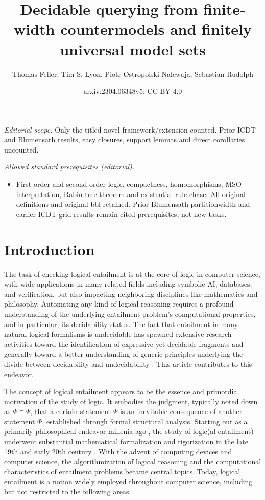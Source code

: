 \documentclass[10pt,a4paper]{amsart}
\title{Decidable querying from finite-width countermodels and finitely universal model sets}
\author{Thomas Feller, Tim S. Lyon, Piotr Ostropolski-Nalewaja, Sebastian Rudolph}
\date{arxiv:2304.06348v5; CC BY 4.0}
\theoremstyle{definition}
\numberwithin{equation}{section}
\theoremstyle{plain}
\theoremstyle{definition}
\theoremstyle{myexample}
\theoremstyle{plain}
\theoremstyle{definition}
\begin{document}
\maketitle
\noindent\textit{Editorial scope.} Only the titled novel framework/extension counted. Prior ICDT and Blumensath results, easy closures, support lemmas and direct corollaries uncounted.\par\medskip
\noindent\textit{Allowed standard prerequisites (editorial).}\begin{itemize}
\item First-order and second-order logic, compactness, homomorphisms, MSO interpretation, Rabin tree theorem and existential-rule chase. All original definitions and original bbl retained. Prior Blumensath partitionwidth and earlier ICDT grid results remain cited prerequisites, not new tasks.
\end{itemize}\medskip

%
\section{Introduction}

The task of checking logical entailment is at the core of logic in computer science, with wide applications in many related fields including symbolic AI, databases, and veri\-fi\-ca\-tion, but also impacting neighboring disciplines like mathematics and philosophy.
Automating any kind of logical reasoning 
requires a profound understanding of the underlying entailment problem's computational properties, and in particular, its de\-ci\-da\-bi\-li\-ty status. The fact that entailment in many natural logical formalisms is undecidable has spawned  extensive research activities toward the identification of expressive yet decidable fragments and generally toward a better understanding of generic principles underlying the divide between decidability and undecidability \cite{BorgerGG1997,Vardi96,Gradel01,PrattHartmann23}. This article contributes to this endeavor.

\medskip

The concept of logical entailment appears to be the essence and primordial motivation of the study of logic. It embodies the judgment, typically noted down as $\Phi \models \Psi$, that a certain statement $\Psi$ is an inevitable consequence of another statement $\Phi$, established through formal structural analysis. Starting out as a primarily philosophical endeavor  millenia ago \cite{PriorAnalytics}, the study of logic(\hspace{-1pt}al entailment) underwent substantial mathematical formalization and rigorization in the late 19th and early 20th century \cite{Boole1854,Frege1879,Tarski1943}. With the advent of computing devices and computer science, the algorithmization of logical reasoning and the computational characteristics of entailment problems became central topics. Today, logical entailment is a notion widely employed throughout computer science, including but not restricted to the following areas:      
\end{document}
